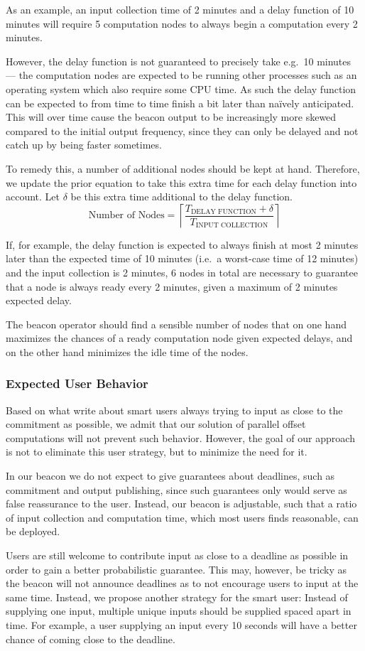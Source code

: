 As an example, an input collection time of 2 minutes and a delay function of 10 minutes will require 5 computation nodes to always begin a computation every 2 minutes.

However, the delay function is not guaranteed to precisely take e.g.\ 10 minutes --- the computation nodes are expected to be running other processes such as an operating system which also require some CPU time.
As such the delay function can be expected to from time to time finish a bit later than naïvely anticipated. This will over time cause the beacon output to be increasingly more skewed compared to the initial output frequency, since they can only be delayed and not catch up by being faster sometimes.

To remedy this, a number of additional nodes should be kept at hand.
Therefore, we update the prior equation to take this extra time for each delay function into account. Let $\delta$ be this extra time additional to the delay function.
\begin{equation*}
    \text{Number of Nodes} = \left\lceil\frac{T_\text{DELAY FUNCTION}+\delta}{T_\text{INPUT COLLECTION}}\right\rceil
\end{equation*}

If, for example, the delay function is expected to always finish at most 2 minutes later than the expected time of 10 minutes (i.e.\ a worst-case time of 12 minutes) and the input collection is 2 minutes, 6 nodes in total are necessary to guarantee that a node is always ready every 2 minutes, given a maximum of 2 minutes expected delay.

The beacon operator should find a sensible number of nodes that on one hand maximizes the chances of a ready computation node given expected delays, and on the other hand minimizes the idle time of the nodes.

\subsubsection{Expected User Behavior}
Based on what \citet{randomzoo} write about smart users always trying to input as close to the commitment as possible, we admit that our solution of parallel offset computations will not prevent such behavior.
However, the goal of our approach is not to eliminate this user strategy, but to minimize the need for it.

In our beacon we do not expect to give guarantees about deadlines, such as commitment and output publishing, since such guarantees only would serve as false reassurance to the user.
Instead, our beacon is adjustable, such that a ratio of input collection and computation time, which most users finds reasonable, can be deployed.

Users are still welcome to contribute input as close to a deadline as possible in order to gain a better probabilistic guarantee. This may, however, be tricky as the beacon will not announce deadlines as to not encourage users to input at the same time. Instead, we propose another strategy for the smart user: Instead of supplying one input, multiple unique inputs should be supplied spaced apart in time. For example, a user supplying an input every 10 seconds will have a better chance of coming close to the deadline.
